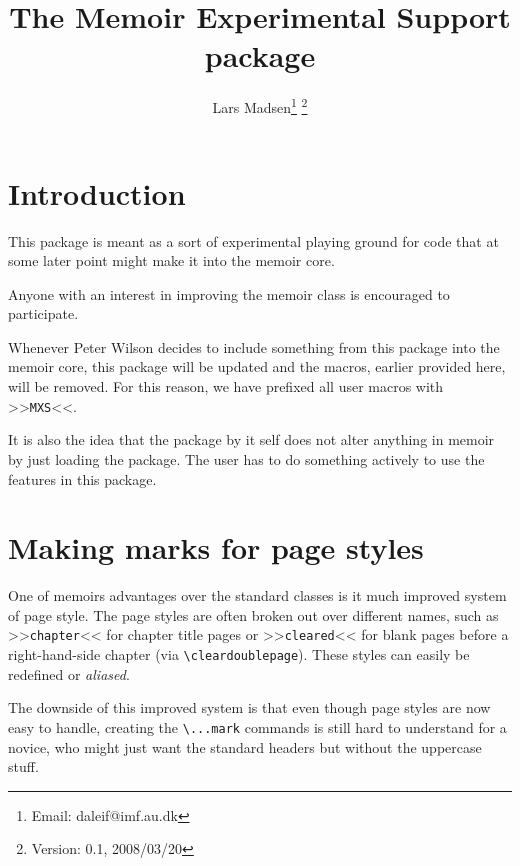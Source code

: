 \documentclass[
a4paper,
11pt,
article
]{memoir}
\begin{document}
\title{The Memoir Experimental Support package}
\author{Lars Madsen\thanks{Email: daleif@imf.au.dk}%
\thanks{Version: 0.1, 2008/03/20}}

\maketitle

\tableofcontents*


\chapter{Introduction}
\label{cha:introduction}

This package is meant as a sort of experimental playing
ground for code that at some later point might make it into
the memoir core.

Anyone with an interest in improving the memoir class is
encouraged to participate.

Whenever Peter Wilson decides to include something from this package
into the memoir core, this package will be updated and the macros,
earlier provided here, will be removed. For this reason, we
have prefixed all user macros with >>\verb+MXS+<<.

It is also the idea that the package by it self does not
alter anything in memoir by just loading the package. The
user has to do something actively to use the features in
this package.

\chapter{Making marks for page styles}
\label{cha:making-marks-page}

One of memoirs advantages over the standard classes is it much
improved system of page style. The page styles are often broken out
over different names, such as >>\verb+chapter+<< for chapter title
pages or >>\verb+cleared+<< for blank pages before a right-hand-side
chapter (via \verb+\cleardoublepage+). These styles can easily be
redefined or \emph{aliased}.

The downside of this improved system is that even though page styles
are now easy to handle, creating the \verb+\...mark+ commands is still
hard to understand for a novice, who might just want the standard
headers but without the uppercase stuff.
\end{document}
